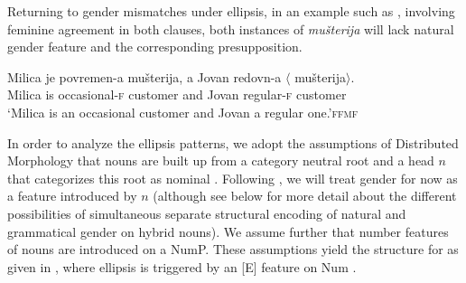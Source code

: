 \documentclass[output=paper,
modfonts,
newtxmath,
hidelinks
]{langscibook}
\begin{document}
\noindent Returning to gender mismatches under ellipsis, in an example such as , involving feminine agreement in both clauses, both instances of \textit{mušterija} will lack natural gender feature and the corresponding presupposition.
		
		\ea\gll Milica je povremen{-a} mušterija, a Jovan redovn{-a} $\langle$\hspace{-2pt} mušterija$\rangle$.\\
		Milica is occasional{-\textsc{f}} customer and Jovan regular{-\textsc{f}} {} customer\\
		\glt `Milica is an occasional customer and Jovan a regular one.'\hfill  \textsc{ffmf}\label{ex31}
        \z
		
\noindent		In order to analyze the ellipsis patterns, we adopt the assumptions of Distributed Morphology that nouns are built up from a category neutral root and a head $n$ that categorizes this root as nominal \citep{hallemarantz93,harleynoyer99,kihm05,acquaviva09,kramerbook}. Following \citet{kramerbook}, we will treat gender for now as a feature introduced by $n$ (although see below for more detail about the different possibilities of simultaneous separate structural encoding of natural and grammatical gender on hybrid nouns). We assume further that number features of nouns are introduced on a NumP. These assumptions yield the structure for  as given in , where ellipsis is triggered by an [E] feature on Num \citep[e.g.][]{merchant14,saabliptak16,saab-nomel}. 		
\end{document}

